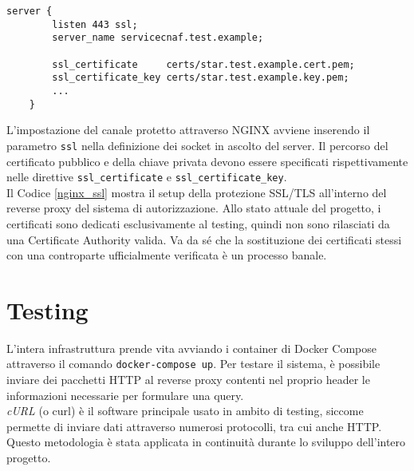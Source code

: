\begin{lstlisting}[caption={[Configurazione della comunicazione tramite SSL/TLS]Configurazione della comunicazione tramite SSL/TLS nel reverse proxy.},captionpos=b,label=nginx_ssl]
    server {
        listen 443 ssl;
        server_name servicecnaf.test.example;

        ssl_certificate     certs/star.test.example.cert.pem;
        ssl_certificate_key certs/star.test.example.key.pem;
        ...
    }
\end{lstlisting}
L'impostazione del canale protetto attraverso NGINX avviene inserendo il parametro \texttt{ssl} nella definizione 
dei socket in ascolto del server. Il percorso del certificato pubblico e della chiave privata devono essere specificati 
rispettivamente nelle direttive \texttt{ssl\_certificate} e \texttt{ssl\_certificate\_key}. \\
Il Codice \ref*{nginx_ssl} mostra il setup della protezione SSL/TLS all'interno del reverse proxy del sistema di autorizzazione.
Allo stato attuale del progetto, i certificati sono dedicati esclusivamente al testing, quindi non sono rilasciati da 
una Certificate Authority valida. Va da sé che 
la sostituzione dei certificati stessi
con una controparte ufficialmente verificata è un processo banale.
\raggedbottom  
\section{Testing}
L'intera infrastruttura prende vita avviando i container di Docker Compose attraverso il comando \texttt{docker-compose up}.
Per testare il sistema, è possibile inviare dei pacchetti HTTP al reverse proxy contenti nel proprio header le informazioni necessarie per formulare una query.
\\ \textit{cURL} (o curl) \cite{curl} è il software principale usato in ambito di testing, siccome permette di inviare dati attraverso 
numerosi protocolli, tra cui anche HTTP. 
\\ Questo metodologia è stata applicata in continuità durante lo sviluppo dell'intero progetto. 